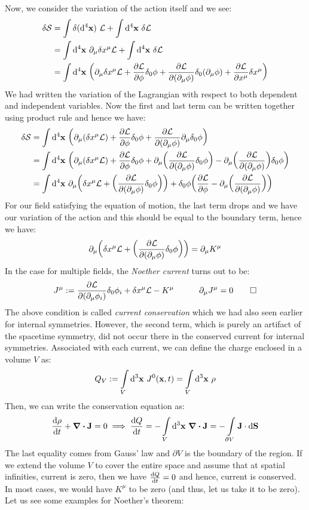 Now, we consider the variation of the action itself and we see:
\begin{align*}
    \delta \mathcal S &= \int \delta (\dd^4\vb{x} )\  \mathcal L + \int \dd^4\vb{x} \ \delta \mathcal L\\
    &=\int\dd^4\vb{x}\ \partial_\mu\delta x^\mu\mathcal L + \int \dd^4\vb{x}\ \delta\mathcal L\\
    &=\int \dd^4\vb{x}\ \qty(\partial_\mu\delta x^\mu\mathcal L+ \pdv{\mathcal L}{\phi}\delta_0\phi + \pdv{\mathcal L}{(\partial_\mu\phi)}\delta_0(\partial_\mu\phi)+\pdv{\mathcal L}{x^\mu}\delta x^\mu)
\end{align*}
We had written the variation of the Lagrangian with respect to both dependent and independent variables. Now the first and last term can be written together using product rule and hence we have:
\begin{align*}
    \delta \mathcal S &= \int \dd^4\vb{x}\ \qty(\partial_\mu(\delta x^\mu \mathcal L)+ \pdv{\mathcal L}{\phi}\delta_0\phi + \pdv{\mathcal L}{(\partial_\mu\phi)}\partial_\mu\delta_0\phi)\\
    &=\int \dd^4\vb{x}\ \qty(\partial_\mu(\delta x^\mu \mathcal L)+ \pdv{\mathcal L}{\phi}\delta_0\phi + \partial_\mu\qty(\pdv{\mathcal L}{(\partial_\mu\phi)}\delta_0\phi) - \partial_\mu\qty(\pdv{\mathcal L}{(\partial_\mu\phi)})\delta_0\phi)\\
    &=\int \dd^4\vb{x}\  \partial_\mu\qty(\delta x^\mu \mathcal L +\qty(\pdv{\mathcal L}{(\partial_\mu\phi)}\delta_0\phi))+\delta_0\phi\qty(\pdv{\mathcal L}{\phi} - \partial_\mu\qty(\pdv{\mathcal L}{(\partial_\mu\phi)}))
\end{align*}
For our field satisfying the equation of motion, the last term drops and we have our variation of the action and this should be equal to the boundary term, hence we have:
\begin{align*}
     \partial_\mu\qty(\delta x^\mu \mathcal L +\qty(\pdv{\mathcal L}{(\partial_\mu\phi)}\delta_0\phi)) =  \partial_\mu K^\mu
\end{align*}
In the case for multiple fields, the \textit{Noether current} turns out to be:
$$J^\mu :=\pdv{\mathcal L}{(\partial_\mu\phi_i)}\delta_0\phi_i +\delta x^\mu \mathcal L  -  K^\mu\qquad\quad \partial_\mu J^\mu =0\qed$$
The above condition is called \textit{current conservation} which we had also seen earlier for internal symmetries. However, the second term, which is purely an artifact of the spacetime symmetry, did not occur there in the conserved current for internal symmetries.  Associated with each current, we can define the charge enclosed in a volume $V$ as:
$$Q_{V} := \int\limits_{V} \dd^3\vb{x} \ J^0(\vb{x},t)  = \int\limits_{V} \dd^3\vb{x} \ \rho$$
Then, we can write the conservation equation as:
$$\dv{\rho}{t} + \div \vb{J} =0\implies \dv{Q}{t} = -\int\limits_{V} \dd^3\vb{x} \ \div \vb{J} = -\int\limits_{\partial V} \vb{J}\cdot \dd\vb{S}$$
The last equality comes from Gauss' law and $\partial V$ is the boundary of the region. If we extend the volume $V$ to cover the entire space and assume that at spatial infinities, current is zero, then we have $\dv{Q}{t}=0$ and hence, current is conserved.  
In most cases, we would have $K^\mu$ to be zero (and thus, let us take it to be zero). Let us see some examples for Noether's theorem:
